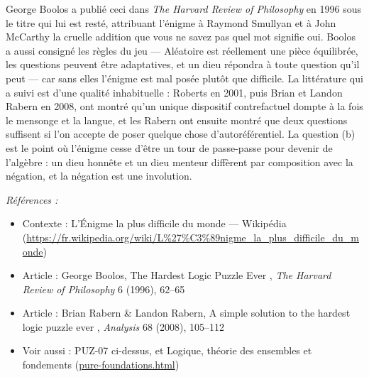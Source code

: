\documentclass[11pt]{article}
\newenvironment{refs}{\par\small\noindent\emph{Références :}\begin{itemize}\setlength\itemsep{0pt}}{\end{itemize}\normalsize}
\begin{document}
\noindent George Boolos a publié ceci dans \textit{The Harvard Review of Philosophy}
en 1996 sous le titre qui lui est resté, attribuant l'énigme à Raymond Smullyan et à John
McCarthy la cruelle addition que vous ne savez pas quel mot signifie oui. Boolos a aussi
consigné les règles du jeu --- Aléatoire est réellement une pièce équilibrée, les questions
peuvent être adaptatives, et un dieu répondra à toute question qu'il peut --- car sans elles
l'énigme est mal posée plutôt que difficile. La littérature qui a suivi est d'une qualité
inhabituelle : Roberts en 2001, puis Brian et Landon Rabern en 2008, ont montré qu'un unique
dispositif contrefactuel dompte à la fois le mensonge et la langue, et les Rabern ont ensuite
montré que deux questions suffisent si l'on accepte de poser quelque chose
d'autoréférentiel. La question (b) est le point où l'énigme cesse d'être un tour de passe-passe
pour devenir de l'algèbre : un dieu honnête et un dieu menteur diffèrent par composition avec
la négation, et la négation est une involution.

\begin{refs}
\item Contexte : L'Énigme la plus difficile du monde --- Wikipédia (\url{https://fr.wikipedia.org/wiki/L%27%C3%89nigme_la_plus_difficile_du_monde})
\item Article : George Boolos, \og{} The Hardest Logic Puzzle Ever \fg{}, \textit{The Harvard Review of Philosophy} 6 (1996), 62--65
\item Article : Brian Rabern \& Landon Rabern, \og{} A simple solution to the hardest logic puzzle ever \fg{}, \textit{Analysis} 68 (2008), 105--112
\item Voir aussi : PUZ-07 ci-dessus, et Logique, théorie des ensembles et fondements (\url{pure-foundations.html})
\end{refs}

\bigskip
\end{document}
